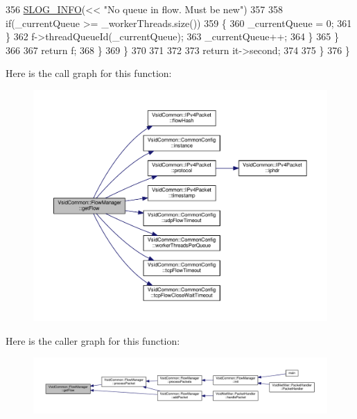 \begin{DoxyCode}
356                         \hyperlink{_logger_8h_a119c1c29ba35a8db38e2358e41167282}{SLOG\_INFO}(<< \textcolor{stringliteral}{"No queue in flow. Must be new"})
357                         
358                         if(\_currentQueue >= \_workerThreads.size())
359                         \{
360                             \_currentQueue = 0;
361                         \}
362                         f->threadQueueId(\_currentQueue);
363                         \_currentQueue++;
364                     \}
365                 \}
366 
367                 \textcolor{keywordflow}{return} f;
368             \}
369         \}
370 
371 
372 
373         \textcolor{keywordflow}{return} it->second;
374 
375     \}
376 \}
\end{DoxyCode}


Here is the call graph for this function\-:
\nopagebreak
\begin{figure}[H]
\begin{center}
\leavevmode
\includegraphics[width=350pt]{class_vsid_common_1_1_flow_manager_ad8e2576a43951a72d71b5cb9827e80e3_cgraph}
\end{center}
\end{figure}




Here is the caller graph for this function\-:
\nopagebreak
\begin{figure}[H]
\begin{center}
\leavevmode
\includegraphics[width=350pt]{class_vsid_common_1_1_flow_manager_ad8e2576a43951a72d71b5cb9827e80e3_icgraph}
\end{center}
\end{figure}



